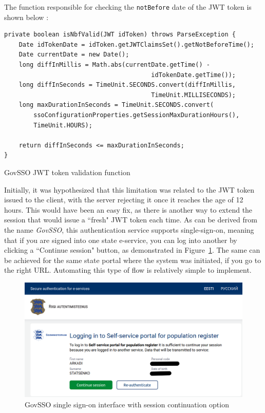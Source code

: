 The function responsible for checking the \texttt{notBefore} date of the JWT token is shown below \cite{govsso-session-hydra}:

\begin{listing}[H]
\begin{verbatim}
private boolean isNbfValid(JWT idToken) throws ParseException {
    Date idTokenDate = idToken.getJWTClaimsSet().getNotBeforeTime();
    Date currentDate = new Date();
    long diffInMillis = Math.abs(currentDate.getTime() -
                                        idTokenDate.getTime());
    long diffInSeconds = TimeUnit.SECONDS.convert(diffInMillis, 
                                        TimeUnit.MILLISECONDS);
    long maxDurationInSeconds = TimeUnit.SECONDS.convert(
        ssoConfigurationProperties.getSessionMaxDurationHours(), 
        TimeUnit.HOURS);

    return diffInSeconds <= maxDurationInSeconds;
}
\end{verbatim}
\caption{GovSSO JWT token validation function}
\label{lst:govsso-jwt-validation}
\end{listing}

Initially, it was hypothesized that this limitation was related to the JWT token issued to the client, with the server rejecting it once it reaches the age of 12 hours. This would have been an easy fix, as there is another way to extend the session that would issue a ``fresh" JWT token each time. As can be derived from the name \textit{GovSSO}, this authentication service supports single-sign-on, meaning that if you are signed into one state e-service, you can log into another by clicking a ``Continue session" button, as demonstrated in Figure~\ref{fig:eesti-ee-continue-session}. The same can be achieved for the same state portal where the system was initiated, if you go to the right URL. Automating this type of flow is relatively simple to implement.

\begin{figure}[H]
\centering
\includegraphics[width=450px]{english/figures/Screenshot from 2025-08-08 20-37-42.png}
\caption{GovSSO single sign-on interface with session continuation option \cite{eesti-ee-screenshot}}
\label{fig:eesti-ee-continue-session}
\end{figure}

